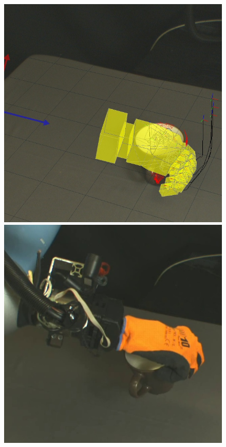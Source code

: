 \begin{figure}
\begin{center}
  \includegraphics[width=\tw]{images/experiments/query/mug1-1-s}
 \includegraphics[width=\tw]{images/experiments/exec/mug1-s}\\

\end{center}
\end{figure}
